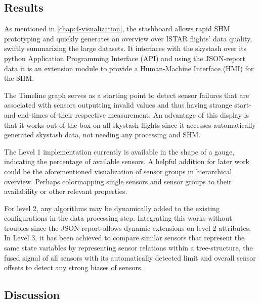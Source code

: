 \subsection{Results}
As mentioned in \ref{chap:4-visualization}, the stashboard allows rapid SHM prototyping and quickly generates an overview over ISTAR flights' data quality, swiftly summarizing the large datasets. It interfaces with the skystash over its python Application Programming Interface (API) and using the JSON-report data it is an extension module to provide a Human-Machine Interface (HMI) for the SHM.

The Timeline graph serves as a starting point to detect sensor failures that are associated with sensors outputting invalid values and thus having strange start- and end-times of their respective measurement. An advantage of this display is that it works out of the box on all skystash flights  since it accesses automatically generated skystash data, not needing any processing and SHM.

The Level 1 implementation currently is available in the shape of a gauge, indicating the percentage of available sensors. A helpful addition for later work could be the aforementioned visualization of sensor groups in hierarchical overview. Perhaps colormapping single sensors and sensor groups to their availability or other relevant properties.

For level 2, any algorithms may be dynamically added to the existing configurations in the data processing step. Integrating this works without troubles since the JSON-report allows dynamic extensions on level 2 attributes.
In Level 3, it has been achieved to compare similar sensors that represent the same state variables by representing sensor relations within a tree-structure, the fused signal of all sensors with its automatically detected limit and overall sensor offsets to detect any strong biases of sensors.

\subsection{Discussion}


